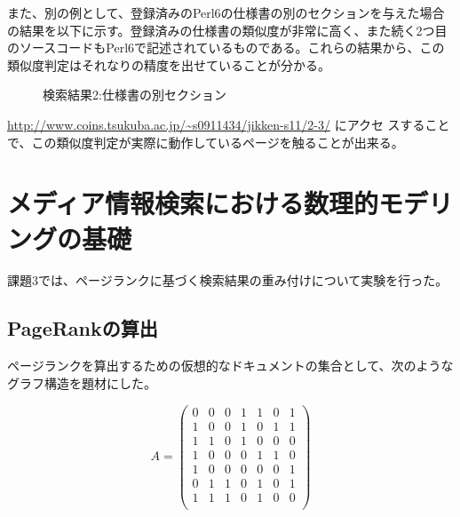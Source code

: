 \documentclass[a4paper,9pt]{jsarticle}
\begin{document}
また、別の例として、登録済みのPerl6の仕様書の別のセクションを与えた場合
の結果を以下に示す。登録済みの仕様書の類似度が非常に高く、また続く2つ目
のソースコードもPerl6で記述されているものである。これらの結果から、この
類似度判定はそれなりの精度を出せていることが分かる。


\begin{figure}[H]
 \caption{検索結果2:仕様書の別セクション}
 \begin{center}
 \end{center}
\end{figure}

\url{http://www.coins.tsukuba.ac.jp/~s0911434/jikken-s11/2-3/} にアクセ
スすることで、この類似度判定が実際に動作しているページを触ることが出来る。

\section{メディア情報検索における数理的モデリングの基礎}
課題3では、ページランクに基づく検索結果の重み付けについて実験を行った。

\subsection{PageRankの算出}
ページランクを算出するための仮想的なドキュメントの集合として、次のような
グラフ構造を題材にした。

\begin{equation}
 A=
  \begin{pmatrix}
   0&0&0&1&1&0&1\\
   1&0&0&1&0&1&1\\
   1&1&0&1&0&0&0\\
   1&0&0&0&1&1&0\\
   1&0&0&0&0&0&1\\
   0&1&1&0&1&0&1\\
   1&1&1&0&1&0&0\\
  \end{pmatrix}
\end{equation}
\end{document}
